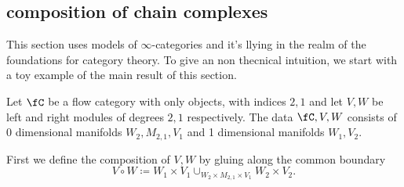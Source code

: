 \subsection{composition of chain complexes}

This section uses models of $\infty$-categories and it's llying in the realm of the foundations for category theory. To give an non thecnical intuition, we start with a toy example of the main result of this section.

Let $\fC$ be a flow category with only objects, with indices $2,1$ and let $V,W$ be left and right modules of degrees $2,1$ respectively.
The data $\fC,V,W$ consists of 0 dimensional manifolds $W_2, M_{2,1}, V_1$ and 1 dimensional manifolds $W_1, V_2$.

First we define the composition of $V,W$ by gluing along the common boundary
\[
    V \circ W \coloneq W_1 \times V_1 \cup_{W_2 \times M_{2,1} \times V_1} W_2 \times V_2.
\]

